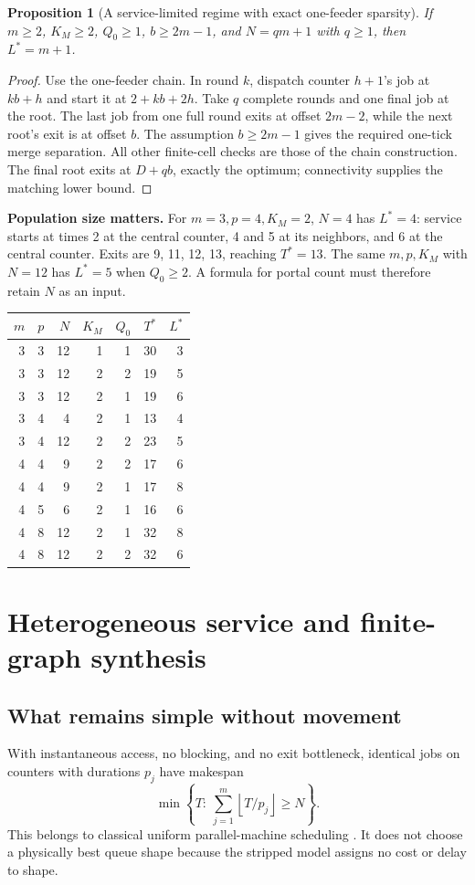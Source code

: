 \documentclass[11pt]{article}
\newtheorem{proposition}[theorem]{Proposition}
\newcommand{\floor}[1]{\left\lfloor#1\right\rfloor}
\begin{document}
\begin{proposition}[A service-limited regime with exact one-feeder sparsity]
If $m\ge2$, $K_M\ge2$, $Q_0\ge1$, $b\ge2m-1$, and $N=qm+1$ with $q\ge1$, then $L^*=m+1$.
\end{proposition}
\begin{proof}
Use the one-feeder chain. In round $k$, dispatch counter $h+1$'s job at $kb+h$ and start it at $2+kb+2h$. Take $q$ complete rounds and one final job at the root. The last job from one full round exits at offset $2m-2$, while the next root's exit is at offset $b$. The assumption $b\ge2m-1$ gives the required one-tick merge separation. All other finite-cell checks are those of the chain construction. The final root exits at $D+qb$, exactly the optimum; connectivity supplies the matching lower bound.
\end{proof}

\textbf{Population size matters.} For $m=3,p=4,K_M=2$, $N=4$ has $L^*=4$: service starts at times 2 at the central counter, 4 and 5 at its neighbors, and 6 at the central counter. Exits are 9, 11, 12, 13, reaching $T^*=13$. The same $m,p,K_M$ with $N=12$ has $L^*=5$ when $Q_0\ge2$. A formula for portal count must therefore retain $N$ as an input.

\begin{center}\small
\begin{tabular}{rrrrrrr}
\toprule
$m$&$p$&$N$&$K_M$&$Q_0$&$T^*$&$L^*$\\\midrule
3&3&12&1&1&30&3\\
3&3&12&2&2&19&5\\
3&3&12&2&1&19&6\\
3&4&4&2&1&13&4\\
3&4&12&2&2&23&5\\
4&4&9&2&2&17&6\\
4&4&9&2&1&17&8\\
4&5&6&2&1&16&6\\
4&8&12&2&1&32&8\\
4&8&12&2&2&32&6\\
\bottomrule
\end{tabular}
\end{center}

\section{Heterogeneous service and finite-graph synthesis}
\subsection{What remains simple without movement}
With instantaneous access, no blocking, and no exit bottleneck, identical jobs on counters with durations $p_j$ have makespan
\[
 \min\left\{T:\ \sum_{j=1}^m\floor{T/p_j}\ge N\right\}.
\]
This belongs to classical uniform parallel-machine scheduling \cite{dessouky}. It does not choose a physically best queue shape because the stripped model assigns no cost or delay to shape.
\end{document}
